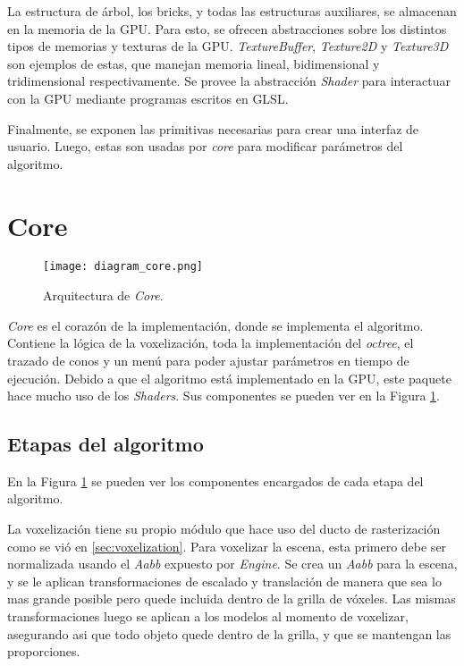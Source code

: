 La estructura de árbol, los bricks, y todas las estructuras auxiliares, se almacenan en la memoria de la GPU.
Para esto, se ofrecen abstracciones sobre los distintos tipos de memorias y texturas de la GPU.
\textit{TextureBuffer}, \textit{Texture2D} y \textit{Texture3D} son ejemplos de estas, que manejan memoria lineal, bidimensional y tridimensional respectivamente.
Se provee la abstracción \textit{Shader} para interactuar con la GPU mediante programas escritos en GLSL.

Finalmente, se exponen las primitivas necesarias para crear una interfaz de usuario.
Luego, estas son usadas por \textit{core} para modificar parámetros del algoritmo.

\section{Core}

\begin{figure}[ht]
    \centering
    \texttt{[image: diagram\_core.png]}
    \caption{Arquitectura de \textit{Core}.}
    \label{fig:core_architecture}
\end{figure}

\textit{Core} es el corazón de la implementación, donde se implementa el algoritmo.
Contiene la lógica de la voxelización, toda la implementación del \textit{octree}, el trazado de conos y un menú para poder ajustar parámetros en tiempo de ejecución.
Debido a que el algoritmo está implementado en la GPU, este paquete hace mucho uso de los \textit{Shaders}.
Sus componentes se pueden ver en la Figura \ref{fig:core_architecture}.

\subsection{Etapas del algoritmo}

En la Figura \ref{fig:core_architecture} se pueden ver los componentes encargados de cada etapa del algoritmo.

La voxelización tiene su propio módulo que hace uso del ducto de rasterización como se vió en \ref{sec:voxelization}.
Para voxelizar la escena, esta primero debe ser normalizada usando el \textit{Aabb} expuesto por \textit{Engine}.
Se crea un \textit{Aabb} para la escena, y se le aplican transformaciones de escalado y translación de manera que sea lo mas grande posible pero quede incluida dentro de la grilla de vóxeles.
Las mismas transformaciones luego se aplican a los modelos al momento de voxelizar, asegurando asi que todo objeto quede dentro de la grilla, y que se mantengan las proporciones.

